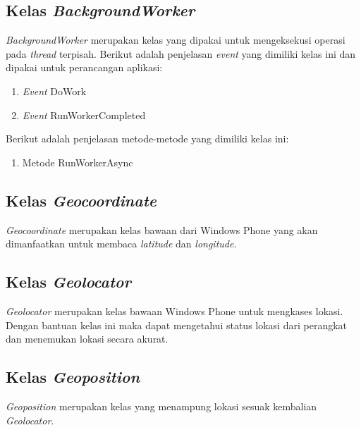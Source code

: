 \subsection{Kelas \textit{BackgroundWorker}}
\label{lab:Kelas BackgroundWorker}
\hspace{0.5cm} \textit{BackgroundWorker} merupakan kelas yang dipakai untuk mengeksekusi operasi pada \textit{thread} terpisah. Berikut adalah penjelasan \textit{event} yang dimiliki kelas ini dan dipakai untuk perancangan aplikasi:
\begin{enumerate}
	\item \textit{Event} DoWork
	\item \textit{Event} RunWorkerCompleted
\end{enumerate}
Berikut adalah penjelasan metode-metode yang dimiliki kelas ini:
\begin{enumerate}
	\item Metode RunWorkerAsync
\end{enumerate}

\subsection{Kelas \textit{Geocoordinate}}
\label{lab:Kelas Geocoordinate}
\hspace{0.5cm} \textit{Geocoordinate} merupakan kelas bawaan dari Windows Phone yang akan dimanfaatkan untuk membaca \textit{latitude} dan \textit{longitude}.

\subsection{Kelas \textit{Geolocator}}
\label{lab:Kelas Geolocator}
\hspace{0.5cm} \textit{Geolocator} merupakan kelas bawaan Windows Phone untuk mengkases lokasi. Dengan bantuan kelas ini maka dapat mengetahui status lokasi dari perangkat dan menemukan lokasi secara akurat.

\subsection{Kelas \textit{Geoposition}}
\label{lab:Kelas Geoposition}
\hspace{0.5cm} \textit{Geoposition} merupakan kelas yang menampung lokasi sesuak kembalian \textit{Geolocator}.

